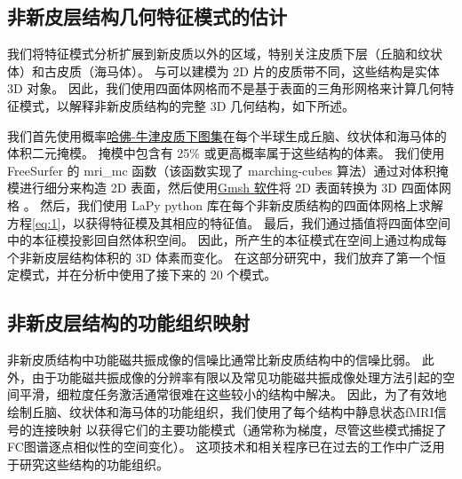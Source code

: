 \documentclass[lang=cn,a4paper,newtx]{elegantpaper}
\begin{document}
\subsection{非新皮层结构几何特征模式的估计} \label{sec:geometric_estimation}

我们将特征模式分析扩展到新皮质以外的区域，特别关注皮质下层（丘脑和纹状体）和古皮质（海马体）。
与可以建模为 2D 片的皮质带不同，这些结构是实体 3D 对象。 
因此，我们使用四面体网格而不是基于表面的三角形网格来计算几何特征模式，以解释非新皮质结构的完整 3D 几何结构\cite{wachinger2015brainprint}，如下所述。


我们首先使用概率\href{https://fsl.fmrib.ox.ac.uk/fsl/fslwiki/Atlases}{哈佛-牛津皮质下图集}在每个半球生成丘脑、纹状体和海马体的体积二元掩模。
掩模中包含有 25\% 或更高概率属于这些结构的体素。
我们使用 FreeSurfer 的 mri\_mc 函数（该函数实现了 marching-cubes 算法）通过对体积掩模进行细分来构造 2D 表面，然后使用\href{https://gmsh.info/}{Gmsh 软件}将 2D 表面转换为 3D 四面体网格 。
然后，我们使用 LaPy python 库在每个非新皮质结构的四面体网格上求解方程\ref{eq:1}，以获得特征模及其相应的特征值。
最后，我们通过插值将四面体空间中的本征模投影回自然体积空间。
因此，所产生的本征模式在空间上通过构成每个非新皮层结构体积的 3D 体素而变化。
在这部分研究中，我们放弃了第一个恒定模式，并在分析中使用了接下来的 20 个模式。


\subsection{非新皮层结构的功能组织映射} \label{sec:functional_mapping}

非新皮质结构中功能磁共振成像的信噪比通常比新皮质结构中的信噪比弱\cite{uugurbil2013pushing}。
此外，由于功能磁共振成像的分辨率有限以及常见功能磁共振成像处理方法引起的空间平滑，细粒度任务激活通常很难在这些较小的结构中解决。
因此，为了有效地绘制丘脑、纹状体和海马体的功能组织，我们使用了每个结构中静息状态fMRI信号的连接映射\cite{haak2018connectopic} 以获得它们的主要功能模式（通常称为梯度，尽管这些模式捕捉了FC图谱逐点相似性的空间变化）。
这项技术和相关程序已在过去的工作中广泛用于研究这些结构的功能组织\cite{vos2018anatomical,yang2020thalamic,oldehinkel2022mapping}。
\end{document}
